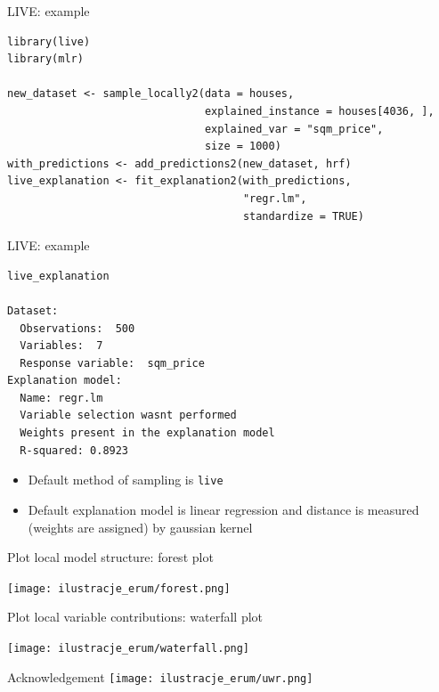 \documentclass[xcolor={dvipsnames}]{beamer}
\begin{document}
\begin{frame}[fragile]{LIVE: example}
\begin{lstlisting}
library(live)
library(mlr)

new_dataset <- sample_locally2(data = houses,
                               explained_instance = houses[4036, ],
                               explained_var = "sqm_price",
                               size = 1000)
with_predictions <- add_predictions2(new_dataset, hrf)
live_explanation <- fit_explanation2(with_predictions, 
                                     "regr.lm", 
                                     standardize = TRUE)
\end{lstlisting}
\end{frame}

\begin{frame}[fragile]{LIVE: example}
\begin{lstlisting}
live_explanation

Dataset: 
  Observations:  500 
  Variables:  7 
  Response variable:  sqm_price 
Explanation model: 
  Name: regr.lm 
  Variable selection wasnt performed 
  Weights present in the explanation model 
  R-squared: 0.8923
\end{lstlisting}
\begin{itemize}
	\item Default method of sampling is \texttt{live}
	\item Default explanation model is linear regression and distance is measured (weights are assigned) by gaussian kernel
\end{itemize}
\end{frame}

\begin{frame}[fragile]{Plot local model structure: forest plot}
	\begin{center}
	\texttt{[image: ilustracje\_erum/forest.png]}		
	\end{center}
\end{frame}

\begin{frame}[fragile]{Plot local variable contributions: waterfall plot}
	\begin{center}
		\texttt{[image: ilustracje\_erum/waterfall.png]}
	\end{center}
\end{frame}

\begin{frame}{Acknowledgement}
	\centering
	\texttt{[image: ilustracje\_erum/uwr.png]}
\end{frame} 
\end{document}
